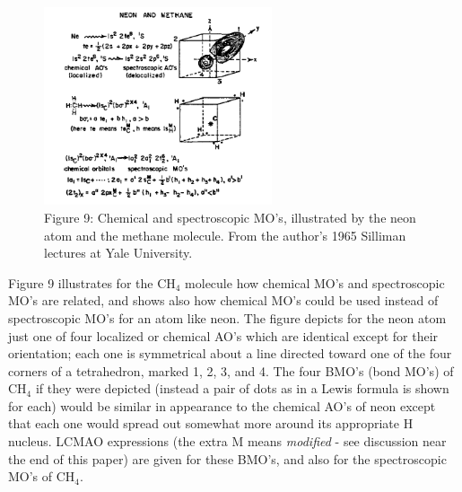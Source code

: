 \documentclass[11pt]{memoir}
\begin{document}
\begin{figure}
\begin{center}
\includegraphics[width=0.6\textwidth]{images/mulliken_figure9.png}
\end{center}
\caption*{Figure 9: Chemical and spectroscopic MO's, illustrated by the neon atom and the methane molecule.  From the author's 1965 Silliman lectures at Yale University.}
\end{figure}


Figure 9 illustrates for the $\mathrm{CH_4}$ molecule how chemical MO's and spectroscopic MO's are related, and shows also how chemical MO's could be used instead of spectroscopic MO's for an atom like neon.  The figure depicts for the neon atom just one of four localized or chemical AO's which are identical except for their orientation; each one is symmetrical about a line directed toward one of the four corners of a tetrahedron, marked 1, 2, 3, and 4.  The four BMO's (bond MO's) of $\mathrm{CH_4}$ if they were depicted (instead a pair of dots as in a Lewis formula is shown for each) would be similar in appearance to the chemical AO's of neon except that each one would spread out somewhat more around its appropriate H nucleus.  LCMAO expressions (the extra M means \emph{modified} - see discussion near the end of this paper) are given for these BMO's, and also for the spectroscopic MO's of $\mathrm{CH_4}$.
\end{document}
